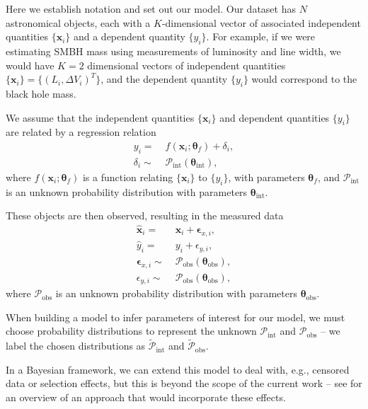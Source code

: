 \documentclass[fleqn,usenatbib]{rasti}
\begin{document}
Here we establish notation and set out our model. Our dataset has $N$
astronomical objects, each with a $K$-dimensional vector of associated
independent quantities $\{\boldsymbol{x}_i\}$ and a dependent quantity
$\{y_i\}$. For example, if we were estimating SMBH mass using measurements of
luminosity and line width, we would have $K = 2$ dimensional vectors of
independent quantities $\{\boldsymbol{x}_i\} = \{(L_i, \Delta V_i)^T\}$, and the
dependent quantity $\{y_i\}$ would correspond to the black hole mass.

We assume that the independent quantities $\{\boldsymbol{x}_i\}$ and dependent
quantities $\{y_i\}$ are related by a regression relation
\begin{align}
    y_i =&\; f(\boldsymbol{x}_i; \boldsymbol{\theta}_f) + \delta_i, \\
    \delta_i \sim&\;
       \mathcal{P}_{\text{int}} \left( \boldsymbol{\theta}_{\text{int}} \right),
\end{align}
where $f(\boldsymbol{x}_i; \boldsymbol{\theta}_f)$ is a function relating
$\{\boldsymbol{x}_i\}$ to $\{y_i\}$, with parameters $\boldsymbol{\theta}_f$,
and $\mathcal{P}_{\text{int}}$ is an unknown probability distribution with
parameters $\boldsymbol{\theta}_{\text{int}}$.

These objects are then observed, resulting in the measured data
\begin{align}
    \hat{\boldsymbol{x}}_i =&\;
        \boldsymbol{x}_i + \boldsymbol{\epsilon}_{x,i}, \\
    \hat{y}_i =&\; y_i + \epsilon_{y,i}, \\
    \boldsymbol{\epsilon}_{x,i} \sim&\;
        \mathcal{P}_{\text{obs}} \left(
            \boldsymbol{\theta}_{\text{obs}}
        \right), \\
    \epsilon_{y,i} \sim&\;
        \mathcal{P}_{\text{obs}} \left(
            \boldsymbol{\theta}_{\text{obs}}
        \right),
\end{align}
where $\mathcal{P}_{\text{obs}}$ is an unknown probability distribution with
parameters $\boldsymbol{\theta}_{\text{obs}}$.

When building a model to infer parameters of interest for our model, we must
choose probability distributions to represent the unknown
$\mathcal{P}_{\text{int}}$ and $\mathcal{P}_{\text{obs}}$ -- we label the chosen
distributions as $\tilde{\mathcal{P}}_{\text{int}}$ and
$\tilde{\mathcal{P}}_{\text{obs}}$.

In a Bayesian framework, we can extend this model to deal with, e.g., censored
data or selection effects, but this is beyond the scope of the current work --
see \citet{Kelly:2007} for an overview of an approach that would incorporate
these effects.
\end{document}
